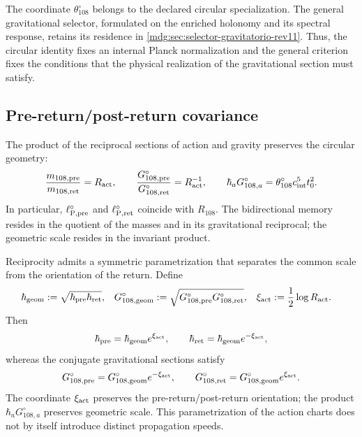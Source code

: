 The coordinate \(\theta_{108}^{\circ}\) belongs to the declared circular
specialization. The general gravitational selector, formulated on the
enriched holonomy and its spectral response, retains its residence in
\cref{mdg:sec:selector-gravitatorio-rev11}. Thus, the circular
identity fixes an internal Planck normalization and the general criterion
fixes the conditions that the physical realization of the gravitational
section must satisfy.

\subsection{Pre-return/post-return covariance}

The product of the reciprocal sections of action and gravity preserves the
circular geometry:
\begin{equation}
 \frac{m_{108,\rm pre}}{m_{108,\rm ret}}=R_{\rm act},
 \qquad
 \frac{G_{108,\rm pre}^{\circ}}{G_{108,\rm ret}^{\circ}}
 =R_{\rm act}^{-1},
 \qquad
 \hbar_a G_{108,a}^{\circ}
 =\theta_{108}^{\circ}c_{\rm int}^{5}t_0^2.
 \label{mdg:eq:planck-ct108-covariancia-pre-ret-rev3}
\end{equation}
In particular, \(\ell_{{\rm P},\rm pre}^{\circ}\) and
\(\ell_{{\rm P},\rm ret}^{\circ}\) coincide with \(R_{108}\). The
bidirectional memory resides in the quotient of the masses and in its
gravitational reciprocal; the geometric scale resides in the invariant product.

Reciprocity admits a symmetric parametrization that separates the common
scale from the orientation of the return. Define
\begin{equation}
 \begin{aligned}
 \hbar_{\rm geom}
 &:=\sqrt{\hbar_{\rm pre}\hbar_{\rm ret}},
 &
 G_{108,\rm geom}^{\circ}
 &:=\sqrt{G_{108,\rm pre}^{\circ}G_{108,\rm ret}^{\circ}},
 &
 \xi_{\rm act}&:=\frac12\log R_{\rm act}.
 \end{aligned}
 \label{mdg:eq:planck-ct108-parametrizacion-simetrica-rev3}
\end{equation}
Then
\[
 \hbar_{\rm pre}=\hbar_{\rm geom}e^{\xi_{\rm act}},
 \qquad
 \hbar_{\rm ret}=\hbar_{\rm geom}e^{-\xi_{\rm act}},
\]
whereas the conjugate gravitational sections satisfy
\[
 G_{108,\rm pre}^{\circ}
 =G_{108,\rm geom}^{\circ}e^{-\xi_{\rm act}},
 \qquad
 G_{108,\rm ret}^{\circ}
 =G_{108,\rm geom}^{\circ}e^{\xi_{\rm act}}.
\]
The coordinate \(\xi_{\rm act}\) preserves the pre-return/post-return
orientation; the product \(\hbar_aG_{108,a}^{\circ}\)
preserves geometric scale. This parametrization of the action charts
does not by itself introduce distinct propagation speeds.

